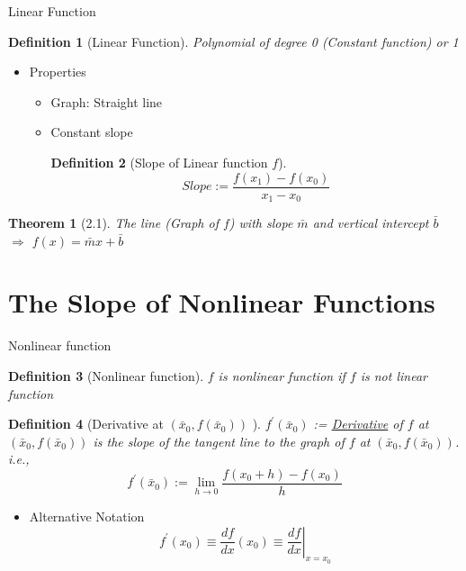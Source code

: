 \documentclass[a4paper,11pt]{article}
\newtheorem{defn}{Definition}
\newtheorem{thm}{Theorem}
\begin{document}
\begin{frame}[t]{Linear Function}
	\begin{defn}
		[Linear Function]
		Polynomial of degree 0 (Constant function) or 1
	\end{defn}
	\begin{itemize}
		\item Properties
		\begin{itemize}
			\item Graph: Straight line
			\item Constant slope 
			\begin{defn}
				[Slope of Linear function $f$]
				\[
					Slope:= \frac{f(x_1)-f(x_0)}{x_1-x_0}
				\]
			\end{defn}
		\end{itemize}
	\end{itemize}
	\begin{thm}
		[2.1]
		The line (Graph of $f$) with slope $\bar m$ and vertical intercept $\bar b$ $\Rightarrow$ $f(x)=\bar m x + \bar b$
	\end{thm}
\end{frame}

\section{The Slope of Nonlinear Functions} %
\label{sec:the_slope_of_nonlinear_functions}

\begin{frame}[t]{Nonlinear function}
	\begin{defn}
		[Nonlinear function]
		$f$ is nonlinear function if $f$ is not linear function
	\end{defn}
	
	\begin{defn}
		[Derivative at $(\bar x_0, f(\bar x_0))$ ]
		$f^\prime(\bar x_0)$ := \uline{Derivative} of $f$ at $(\bar x_0, f(\bar x_0))$ is the slope of the tangent line to the graph of $f$ at $(\bar x_0, f(\bar x_0))$. \textit{i.e.,}
		\[
			f^\prime(\bar x_0):= \lim_{h\rightarrow 0}\frac{f(x_0+h)-f(x_0)}{h}
		\]
	\end{defn}
	\begin{itemize}
		\item Alternative Notation
		\[
			f^\prime(x_0) \equiv \frac{df}{dx}(x_0) \equiv \left.\frac{df}{dx}\right\vert_{x=x_0}
		\]
	\end{itemize}
\end{frame}
\end{document}
